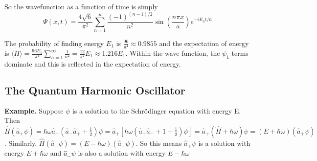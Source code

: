 \documentclass[11pt]{article}
\begin{document}
\noindent So the wavefunction as a function of time is simply
\[
    \Psi(x,t) = \frac{4 \sqrt{6}}{\pi^2}\sum_{n=1}^{\infty} \frac{(-1)^{(n-1)/2}}{n^2}\sin{\left(\frac{n\pi x}{a}\right) e^ {-iE_n t / \hbar}} 
\]

\noindent The probability of finding energy \(E_1\) is \(\frac{96}{\pi^4} \approx 0.9855\) and the expectation of energy is 
\(\langle H \rangle = \frac{96 E_1}{\pi^4} \sum_{n=1}^{\infty}\frac{1}{n^2}  = \frac{12}{\pi^2}E_1 \approx 1.216E_1 \). Within the wave function, the \(\psi_1\) terms dominate
and this is reflected in the expectation of energy. 
\\

\subsection{The Quantum Harmonic Oscillator}

\noindent \textbf{Example.} Suppose \(\psi\) is a solution to the Schr\"odinger equation with energy E. 
\\

\noindent Then \(\hat{H}(\hat{a}_{+}\psi) = \hbar\omega \hat{a}_{+} \left(\hat{a}_{-}\hat{a}_{+} + \frac{1}{2}\right)\psi
= \hat{a}_+ \left[\hbar \omega\left(\hat{a}_+\hat{a}_- + 1 + \frac{1}{2}\right)\psi\right] 
= \hat{a}_+ \left(\hat{H}  +\hbar\omega\right)\psi = (E + \hbar\omega)(\hat{a}_+ \psi)\). Similarly, \(\hat{H}(\hat{a}_-\psi)
= (E - \hbar\omega)(\hat{a}_-\psi)\). So this means \(\hat{a}_+\psi\) is a solution with energy \(E + \hbar\omega\) and \(\hat{a}_-\psi\)
is also a solution with energy \(E - \hbar\omega\)
\end{document}
